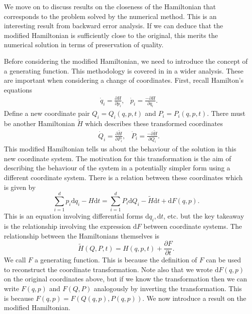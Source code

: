 We move on to discuss results on the closeness of the Hamiltonian that corresponds to the problem solved by the numerical method.
This is an interesting result from backward error analysis.
If we can deduce that the modified Hamiltonian is sufficiently close to the original,
this merits the numerical solution in terms of preservation of quality.

Before considering the modified Hamiltonian, we need to introduce the concept of a generating function.
This methodology is covered in \cite{Casas_2016} in a wider analysis.
These are important when considering a change of coordinates.
First, recall Hamilton's equations
\begin{align*}
	&\dot{q}_i = \frac{\partial H}{\partial p_i}, &\dot{p}_i = \frac{- \partial H}{\partial q_i}.
\end{align*}
Define a new coordinate pair $Q_i = Q_i(q,p,t)$ and $P_i = P_i(q,p,t)$.
There must be another Hamiltonian $\tilde{H}$ which describes these transformed coordinates
\begin{align*}
	&\dot{Q}_i = \frac{\partial \tilde{H}}{\partial P_i}, &\dot{P}_i = \frac{- \partial \tilde{H}}{\partial Q_i}.
\end{align*}
This modified Hamiltonian tells us about the behaviour of the solution in this new coordinate system.
The motivation for this transformation is the aim of describing the behaviour of the system in a potentially simpler form using a different coordinate system. %
There is a relation between these coordinates which is given by
\begin{equation*}
	\sum_{i=1}^{d} p_i \mathrm{d}q_i - H \mathrm{d}t = \sum_{i=1}^{d} P_i \mathrm{d}Q_i - \tilde{H} \mathrm{d}t + \mathrm{d}F(q,p).
\end{equation*}
This is an equation involving differential forms $\mathrm{d}q_i, \mathrm{d}t$, etc. but the key takeaway is the relationship involving the expression $\mathrm{d}F$ between coordinate systems.
The relationship between the Hamiltonians themselves is
\begin{equation*}
	\tilde{H}(Q,P,t) = H(q,p,t) + \frac{\partial F}{\partial t}.
\end{equation*}
We call $F$ a generating function. This is because the definition of $F$ can be used to reconstruct the coordinate transformation.
Note also that we wrote $\mathrm{d}F(q,p)$ on the original coordinates above, but if we know the transformation then we can write $F(q,p)$ and $F(Q,P)$ analogously by inverting the transformation.
This is because $F(q,p) = F(Q(q,p),P(q,p))$.
We now introduce a result on the modified Hamiltonian.

